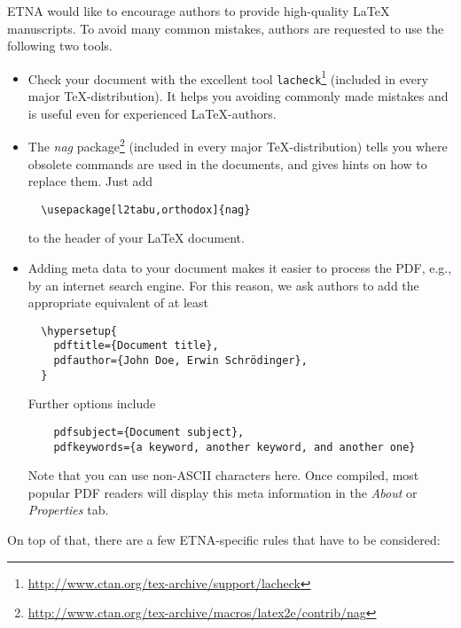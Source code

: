 \documentclass[parskip=half]{scrartcl}
\begin{document}
ETNA would like to encourage authors to provide high-quality \LaTeX{}
manuscripts. To avoid many common mistakes, authors are requested to use the
following two tools.
\begin{itemize}
\item Check your document with the excellent tool
  \verb|lacheck|\footnote{\url{http://www.ctan.org/tex-archive/support/lacheck}}
  (included in every major \TeX{}-dis\-tri\-bu\-tion). It helps you avoiding commonly
  made mistakes and is useful even for experienced \LaTeX{}-authors.

\item The \emph{nag}
  package\footnote{\url{http://www.ctan.org/tex-archive/macros/latex2e/contrib/nag}}
  (included in every major \TeX-distribution) tells you where obsolete commands
  are used in the documents, and gives hints on how to replace them. Just add
  \begin{verbatim}
  \usepackage[l2tabu,orthodox]{nag}
  \end{verbatim}
  to the header of your \LaTeX{} document.

\item Adding meta data to your document makes it easier to process the
  PDF, e.g., by an internet search engine. For this reason, we ask authors to
  add the appropriate equivalent of at least
  \begin{verbatim}
  \hypersetup{
    pdftitle={Document title},
    pdfauthor={John Doe, Erwin Schrödinger},
  }
  \end{verbatim}
  Further options include
  \begin{verbatim}
    pdfsubject={Document subject},
    pdfkeywords={a keyword, another keyword, and another one}
  \end{verbatim}
  Note that you can use non-ASCII characters here.
  Once compiled, most popular PDF readers will display this meta information in
  the \emph{About} or \emph{Properties} tab.
\end{itemize}

On top of that, there are a few ETNA-specific rules that have to be considered:
\end{document}
